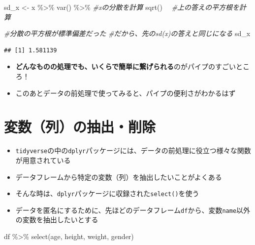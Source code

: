 \documentclass[
]{book}
\newenvironment{Shaded}{\begin{snugshade}}{\end{snugshade}}
\newcommand{\CommentTok}[1]{\textcolor[rgb]{0.56,0.35,0.01}{\textit{#1}}}
\newcommand{\FunctionTok}[1]{\textcolor[rgb]{0.00,0.00,0.00}{#1}}
\newcommand{\NormalTok}[1]{#1}
\newcommand{\OtherTok}[1]{\textcolor[rgb]{0.56,0.35,0.01}{#1}}
\newcommand{\SpecialCharTok}[1]{\textcolor[rgb]{0.00,0.00,0.00}{#1}}
\providecommand{\tightlist}{%
  \setlength{\itemsep}{0pt}\setlength{\parskip}{0pt}}
\begin{document}
\begin{Shaded}
\begin{Highlighting}[]
\NormalTok{sd\_x }\OtherTok{\textless{}{-}} 
\NormalTok{  x }\SpecialCharTok{\%\textgreater{}\%} 
  \FunctionTok{var}\NormalTok{() }\SpecialCharTok{\%\textgreater{}\%} \CommentTok{\#xの分散を計算}
  \FunctionTok{sqrt}\NormalTok{()　  }\CommentTok{\#上の答えの平方根を計算}

\CommentTok{\#分散の平方根が標準偏差だった}
\CommentTok{\#だから、先のsd(x)の答えと同じになる}
\NormalTok{sd\_x }
\end{Highlighting}
\end{Shaded}

\begin{verbatim}
## [1] 1.581139
\end{verbatim}

\begin{itemize}
\tightlist
\item
  \textbf{どんなものの処理でも、いくらで簡単に繋げられる}のがパイプのすごいところ！
\item
  このあとデータの前処理で使ってみると、パイプの便利さがわかるはず
\end{itemize}

\hypertarget{ux5909ux6570ux5217ux306eux62bdux51faux524aux9664}{%
\section{変数（列）の抽出・削除}\label{ux5909ux6570ux5217ux306eux62bdux51faux524aux9664}}

\begin{itemize}
\tightlist
\item
  \texttt{tidyverse}の中の\texttt{dplyr}パッケージには、データの前処理に役立つ様々な関数が用意されている
\item
  データフレームから特定の変数（列）を抽出したいことがよくある
\item
  そんな時は、\texttt{dplyr}パッケージに収録された\texttt{select()}を使う
\item
  データを匿名にするために、先ほどのデータフレーム\texttt{df}から、変数\texttt{name}以外の変数を抽出したいとする
\end{itemize}

\begin{Shaded}
\begin{Highlighting}[]
\NormalTok{df }\SpecialCharTok{\%\textgreater{}\%} 
  \FunctionTok{select}\NormalTok{(age, height, weight, gender) }
\end{Highlighting}
\end{Shaded}
\end{document}
